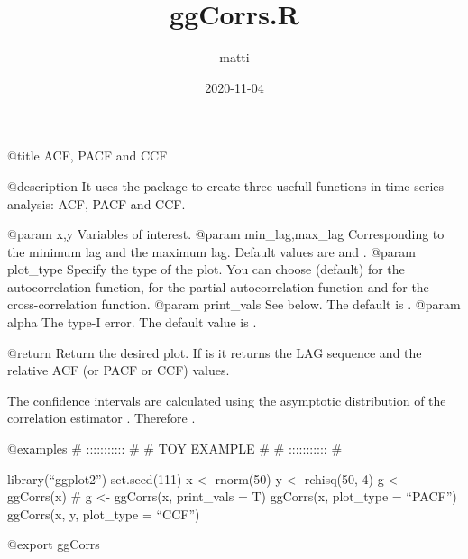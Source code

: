 \documentclass[
]{article}
\title{ggCorrs.R}
\author{matti}
\date{2020-11-04}
\begin{document}
\maketitle

@title ACF, PACF and CCF

@description It uses the  package to create three usefull
functions in time series analysis: ACF, PACF and CCF.

@param x,y Variables of interest. @param min\_lag,max\_lag Corresponding
to the minimum lag and the maximum lag. Default values are
 and . @param plot\_type Specify the
type of the plot. You can choose  (default) for the
autocorrelation function,  for the partial autocorrelation
function and  for the cross-correlation function. @param
print\_vals See below. The default is . @param alpha The
type-I error. The default value is .

@return Return the desired plot. If  is  it
returns the LAG sequence and the relative ACF (or PACF or CCF) values.

The confidence intervals are calculated using the asymptotic
distribution of the correlation estimator .
Therefore .

@examples \# ::::::::::: \# \# TOY EXAMPLE \# \# ::::::::::: \#

library(``ggplot2'') set.seed(111) x \textless- rnorm(50) y \textless-
rchisq(50, 4) g \textless- ggCorrs(x) \# g \textless- ggCorrs(x,
print\_vals = T) ggCorrs(x, plot\_type = ``PACF'') ggCorrs(x, y,
plot\_type = ``CCF'')

@export ggCorrs
\end{document}
